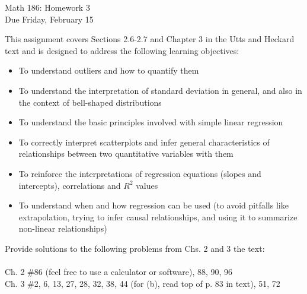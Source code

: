 \documentclass{article}
\begin{document}
\begin{center}
  \Large Math 186: Homework 3\\
  \Large Due Friday, February 15
  \end{center}

This assignment covers Sections 2.6-2.7 and Chapter 3 in the Utts and Heckard text and is designed to address the following learning objectives:\\

\begin{itemize}
\item To understand outliers and how to quantify them
\item To understand the interpretation of standard deviation in general, and also in the context of bell-shaped distributions
\item To understand the basic principles involved with simple linear regression
\item To correctly interpret scatterplots and infer general characteristics of relationships between two quantitative variables with them
\item To reinforce the interpretations of regression equations (slopes and intercepts), correlations and $R^2$ values
\item To understand when and how regression can be used (to avoid pitfalls like extrapolation, trying to infer causal relationships, and using it to summarize non-linear relationships)
\end{itemize}

\hrulefill
\vspace{.2in}

\noindent
Provide solutions to the following problems from Chs. 2 and 3 the text:\\ \\
Ch. 2 \#86 (feel free to use a calculator or software), 88, 90, 96\\

\noindent Ch. 3 \#2, 6, 13, 27, 28, 32, 38, 44 (for (b), read top of p. 83 in text), 51, 72
\end{document}
